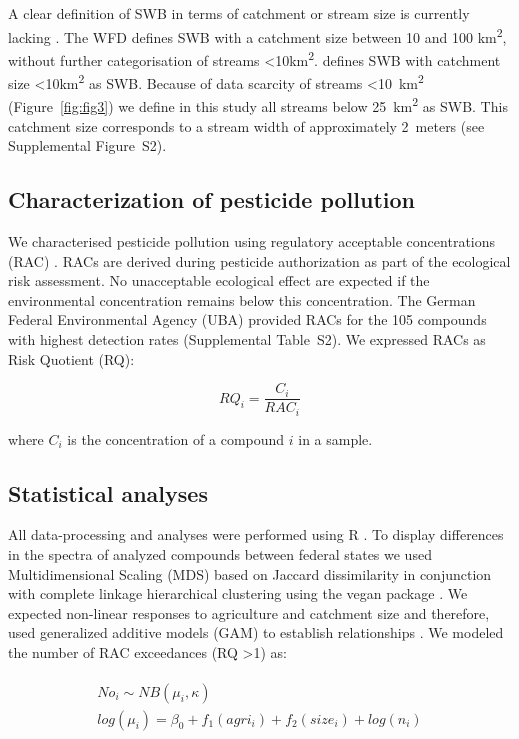 \documentclass[journal=esthag,manuscript=article]{achemso}
\begin{document}
A clear definition of SWB in terms of catchment or stream size is currently lacking \citep{lorenz_specifics_2016}. 
The WFD defines SWB with a catchment size between 10 and 100 km\textsuperscript{2}, without further categorisation of streams \textless 10km\textsuperscript{2}. 
\citet{lorenz_specifics_2016} defines SWB with catchment size \textless 10km\textsuperscript{2} as SWB.
Because of data scarcity of streams \textless 10~km\textsuperscript{2} (Figure~\ref{fig:fig3}) we define in this study all streams below 25~km\textsuperscript{2} as SWB. This catchment size corresponds to a stream width of approximately 2~meters (see Supplemental Figure~S2).


\subsection{Characterization of pesticide pollution}
We characterised pesticide pollution using regulatory acceptable concentrations (RAC) \citep{brock_linking_2010}.
RACs are derived during pesticide authorization as part of the ecological risk assessment.
No unacceptable ecological effect are expected if the environmental concentration remains below this concentration. 
The German Federal Environmental Agency (UBA) provided RACs for the 105 compounds with highest detection rates (Supplemental Table~S2). 
We expressed RACs as Risk Quotient (RQ):

\begin{equation}
RQ_i = \frac{C_i}{RAC_i}
\end{equation}

where $C_i$ is the concentration of a compound $i$ in a sample.


\subsection{Statistical analyses}
All data-processing and analyses were performed using R \citep{r_core_team_r:_2016}.
To display differences in the spectra of analyzed compounds between federal states we used Multidimensional Scaling (MDS) based on Jaccard dissimilarity in conjunction with complete linkage hierarchical clustering using the vegan package \citep{oksanen_vegan:_2016}.
We expected non-linear responses to agriculture and catchment size and therefore, used generalized additive models (GAM) to establish relationships \citep{fewster_analysis_2000}.
We modeled the number of RAC exceedances (RQ \textgreater 1) as:

\begin{align}
\begin{split}
  No_i \sim NB(\mu_i, \kappa) \\
  log(\mu_i)= \beta_0 + f_1(agri_i) + f_2(size_i) + log(n_i) \\
\end{split}
\end{align}
\end{document}
